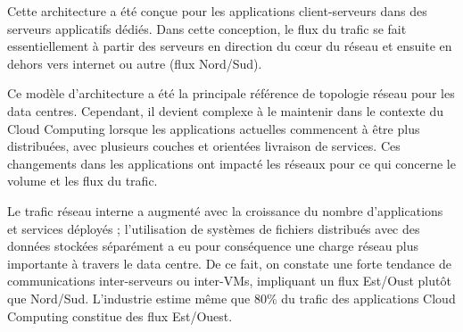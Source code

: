 


Cette architecture a été conçue pour les applications client-serveurs dans des serveurs applicatifs dédiés. Dans cette conception, le flux du trafic se fait essentiellement à partir des serveurs en direction du cœur du réseau et ensuite en dehors vers internet ou autre (flux Nord/Sud).

Ce modèle d'architecture a été la principale référence de topologie réseau pour les data centres. Cependant, il devient complexe à le maintenir dans le contexte du Cloud Computing lorsque les applications actuelles commencent à être plus distribuées, avec plusieurs couches et orientées livraison de services. Ces changements dans les applications ont impacté les réseaux pour ce qui concerne le volume et les flux du trafic. 

Le trafic réseau interne a augmenté avec la croissance du nombre d'applications et services déployés ; l'utilisation de systèmes de fichiers distribués avec des données stockées séparément a eu pour conséquence une charge réseau plus importante à travers le data centre. De ce fait, on constate une forte tendance de communications inter-serveurs ou inter-VMs, impliquant un flux Est/Oust plutôt que Nord/Sud. L'industrie estime même que 80\% du trafic des applications Cloud Computing constitue des flux Est/Ouest.

